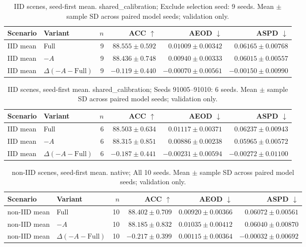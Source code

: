 \begin{table}[t]
\centering
\small
\caption{IID scenes, seed-first mean. shared\_calibration; Exclude selection seed: 9 seeds. Mean $\pm$ sample SD across paired model seeds; validation only.}
\begin{tabular}{llrrrr}
\toprule
Scenario & Variant & $n$ & ACC $\uparrow$ & AEOD $\downarrow$ & ASPD $\downarrow$ \\
\midrule
IID mean & Full & 9 & $88.555 \pm 0.592$ & $0.01009 \pm 0.00342$ & $0.06165 \pm 0.00768$ \\
IID mean & $-A$ & 9 & $88.436 \pm 0.748$ & $0.00940 \pm 0.00333$ & $0.06015 \pm 0.00557$ \\
IID mean & $\Delta(-A-\mathrm{Full})$ & 9 & $-0.119 \pm 0.440$ & $-0.00070 \pm 0.00561$ & $-0.00150 \pm 0.00990$ \\
\bottomrule
\end{tabular}
\end{table}

\begin{table}[t]
\centering
\small
\caption{IID scenes, seed-first mean. shared\_calibration; Seeds 91005–91010: 6 seeds. Mean $\pm$ sample SD across paired model seeds; validation only.}
\begin{tabular}{llrrrr}
\toprule
Scenario & Variant & $n$ & ACC $\uparrow$ & AEOD $\downarrow$ & ASPD $\downarrow$ \\
\midrule
IID mean & Full & 6 & $88.503 \pm 0.634$ & $0.01117 \pm 0.00371$ & $0.06237 \pm 0.00943$ \\
IID mean & $-A$ & 6 & $88.315 \pm 0.851$ & $0.00886 \pm 0.00238$ & $0.05965 \pm 0.00572$ \\
IID mean & $\Delta(-A-\mathrm{Full})$ & 6 & $-0.187 \pm 0.441$ & $-0.00231 \pm 0.00594$ & $-0.00272 \pm 0.01100$ \\
\bottomrule
\end{tabular}
\end{table}

\begin{table}[t]
\centering
\small
\caption{non-IID scenes, seed-first mean. native; All 10 seeds. Mean $\pm$ sample SD across paired model seeds; validation only.}
\begin{tabular}{llrrrr}
\toprule
Scenario & Variant & $n$ & ACC $\uparrow$ & AEOD $\downarrow$ & ASPD $\downarrow$ \\
\midrule
non-IID mean & Full & 10 & $88.402 \pm 0.709$ & $0.00920 \pm 0.00366$ & $0.06072 \pm 0.00561$ \\
non-IID mean & $-A$ & 10 & $88.185 \pm 0.832$ & $0.01035 \pm 0.00412$ & $0.06040 \pm 0.00870$ \\
non-IID mean & $\Delta(-A-\mathrm{Full})$ & 10 & $-0.217 \pm 0.399$ & $0.00115 \pm 0.00364$ & $-0.00032 \pm 0.00692$ \\
\bottomrule
\end{tabular}
\end{table}

